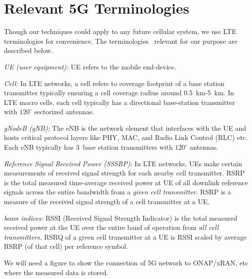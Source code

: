 \documentclass[conference, 10pt]{IEEEtran}
\begin{document}



\section{Relevant 5G Terminologies}
\label{sec:bg}

Though our techniques could apply to any future cellular system, we use LTE
terminologies for convenience. The terminologies~\cite{ltebook} relevant for our purpose are
described below.

{\em UE (user equipment):} UE refers to the mobile end-device.

{\em Cell:} In LTE networks, a cell refers to coverage footprint of a base station
transmitter typically ensuring a cell coverage radius around 0.5~km-5~km.  In LTE
macro cells, each cell typically has a directional base-station transmitter with
$120^\circ$ sectorized antennas.

{\em gNodeB (gNB):} The eNB is the network element that interfaces with the UE and
hosts critical protocol layers like PHY, MAC, and Radio Link Control (RLC) etc. Each
eNB typically has 3~base station transmitters with $120^\circ$ antennas.

{\em Reference Signal Received Power (SSSRP):} In LTE networks, UEs make certain
measurements of received signal strength for each nearby cell transmitter. RSRP is
the total measured time-average received power at UE of all downlink reference
signals across the entire bandwidth from a {\em given cell transmitter}. RSRP is a
measure of the received signal strength of a cell transmitter at a UE.

{\em beam indices:} RSSI (Received Signal Strength Indicator) is the total measured
received power at the UE over the entire band of operation from {\em all cell
transmitters.} RSRQ of a given cell transmitter at a UE is RSSI scaled by average
RSRP (of that cell) per reference symbol.

We will need a figure to show the connection of 5G network to ONAP/xRAN, etc where the measured 
data is stored.
\end{document}
